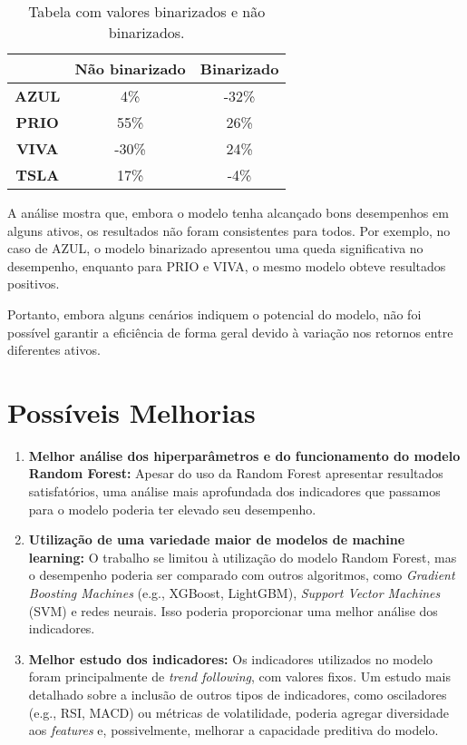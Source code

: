 \documentclass{article}
\begin{document}
\begin{table}[h!]
\centering
\begin{tabular}{|c|c|c|}
\hline
\rowcolor{white!20} 
\textbf{}      & \textbf{Não binarizado} & \textbf{Binarizado} \\ \hline
\textbf{AZUL}  & \cellcolor{green!30}4\%  & \cellcolor{red!30}-32\% \\ \hline
\textbf{PRIO}  & \cellcolor{green!30}55\% & \cellcolor{green!30}26\% \\ \hline
\textbf{VIVA}  & \cellcolor{red!30}-30\% & \cellcolor{green!30}24\% \\ \hline
\textbf{TSLA}  & \cellcolor{green!30}17\% & \cellcolor{red!30}-4\%  \\ \hline
\end{tabular}
\caption{Tabela com valores binarizados e não binarizados.}
\end{table}

A análise mostra que, embora o modelo tenha alcançado bons desempenhos em alguns ativos, os resultados não foram consistentes para todos. Por exemplo, no caso de AZUL, o modelo binarizado apresentou uma queda significativa no desempenho, enquanto para PRIO e VIVA, o mesmo modelo obteve resultados positivos.

Portanto, embora alguns cenários indiquem o potencial do modelo, não foi possível garantir a eficiência de forma geral devido à variação nos retornos entre diferentes ativos.

\newpage
\section{Possíveis Melhorias}

\begin{enumerate}
    \item \textbf{Melhor análise dos hiperparâmetros e do funcionamento do modelo Random Forest:}  
    Apesar do uso da Random Forest apresentar resultados satisfatórios, uma análise mais aprofundada dos indicadores que passamos para o modelo poderia ter elevado seu desempenho.

    \item \textbf{Utilização de uma variedade maior de modelos de machine learning:}  
    O trabalho se limitou à utilização do modelo Random Forest, mas o desempenho poderia ser comparado com outros algoritmos, como \textit{Gradient Boosting Machines} (e.g., XGBoost, LightGBM), \textit{Support Vector Machines} (SVM) e redes neurais. Isso poderia proporcionar uma melhor análise dos indicadores.

    \item \textbf{Melhor estudo dos indicadores:}  
    Os indicadores utilizados no modelo foram principalmente de \textit{trend following}, com valores fixos. Um estudo mais detalhado sobre a inclusão de outros tipos de indicadores, como osciladores (e.g., RSI, MACD) ou métricas de volatilidade, poderia agregar diversidade aos \textit{features} e, possivelmente, melhorar a capacidade preditiva do modelo.
\end{enumerate}
\end{document}
